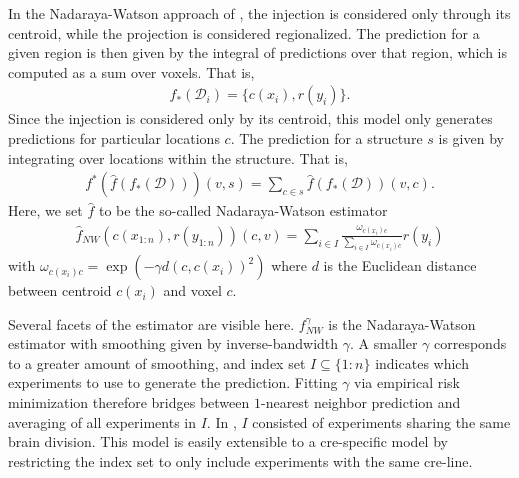 In the Nadaraya-Watson approach of \citet{Knox2019-ot}, the injection is considered only through its centroid, while the projection is considered regionalized.
The prediction for a given region is then given by the integral of predictions over that region, which is computed as a sum over voxels.
That is,
\begin{eqnarray*}
f_*({\mathcal D}_i) = \{c(x_i) , r(y_i)\}.
\end{eqnarray*}
Since the injection is considered only by its centroid, this model only generates predictions for particular locations $c$.  The prediction for a structure $s$ is given by integrating over locations within the structure.
That is,
\begin{eqnarray*}
\label{eq:regionalize}
f^* (\hat f (f_*(\mathcal D))) (v,s) = \sum_{c \in s} \hat f (f_*(\mathcal D)) (v,c).
\end{eqnarray*}
Here, we set $\hat f$ to be the so-called Nadaraya-Watson estimator
\begin{eqnarray*}
\hat f_{NW}( c(x_{1:n}) , r(y_{1:n}) ) (c,v) =  \sum_{i \in I} \frac{ \omega_{c(x_i) c}}{\sum_{i \in I} \omega_{c(x_i) c}} r(y_i)
\end{eqnarray*}
with $\omega_{c(x_i) c} = \exp( - \gamma d( c , c(x_i))^2 )$ where $d$ is the Euclidean distance between centroid $c(x_i)$ and voxel $c$.

Several facets of the estimator are visible here. $f_{NW}^{\gamma}$ is the Nadaraya-Watson estimator with smoothing given by inverse-bandwidth $\gamma$.
A smaller $\gamma$ corresponds to a greater amount of smoothing, and index set $I \subseteq  \{1:n\}$ indicates which experiments to use to generate the prediction.
Fitting $\gamma$ via empirical risk minimization therefore bridges between $1$-nearest neighbor prediction and averaging of all experiments in $I$.
In \citet{Knox2019-ot}, $I$ consisted of experiments sharing the same brain division.
This model is easily extensible to a cre-specific model by restricting the index set to only include experiments with the same cre-line.


